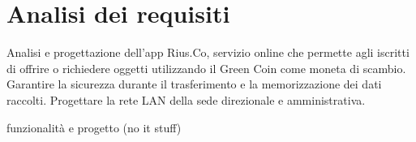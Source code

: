 \section{Analisi dei requisiti}
Analisi e progettazione dell'app Rius.Co, servizio online che permette agli iscritti di offrire o richiedere oggetti utilizzando il Green Coin come moneta di scambio. Garantire la sicurezza durante il trasferimento e la memorizzazione dei dati raccolti. Progettare la rete LAN della sede direzionale e amministrativa.

funzionalità e progetto (no it stuff)